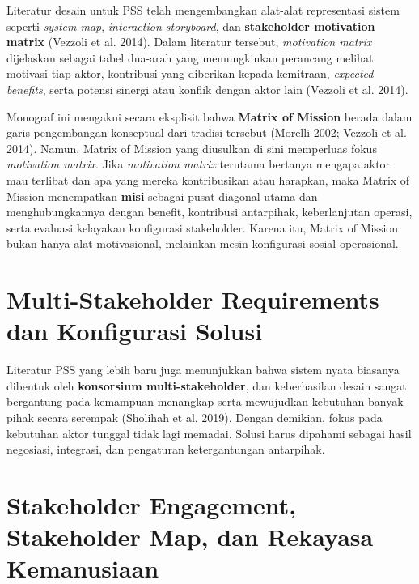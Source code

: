 \documentclass[
  letterpaper,
  DIV=11,
  numbers=noendperiod]{scrreprt}
\begin{document}

Literatur desain untuk PSS telah mengembangkan alat-alat representasi
sistem seperti \emph{system map}, \emph{interaction storyboard}, dan
\textbf{stakeholder motivation matrix} (Vezzoli et al. 2014). Dalam
literatur tersebut, \emph{motivation matrix} dijelaskan sebagai tabel
dua-arah yang memungkinkan perancang melihat motivasi tiap aktor,
kontribusi yang diberikan kepada kemitraan, \emph{expected benefits},
serta potensi sinergi atau konflik dengan aktor lain (Vezzoli et al.
2014).

Monograf ini mengakui secara eksplisit bahwa \textbf{Matrix of Mission}
berada dalam garis pengembangan konseptual dari tradisi tersebut
(Morelli 2002; Vezzoli et al. 2014). Namun, Matrix of Mission yang
diusulkan di sini memperluas fokus \emph{motivation matrix}. Jika
\emph{motivation matrix} terutama bertanya mengapa aktor mau terlibat
dan apa yang mereka kontribusikan atau harapkan, maka Matrix of Mission
menempatkan \textbf{misi} sebagai pusat diagonal utama dan
menghubungkannya dengan benefit, kontribusi antarpihak, keberlanjutan
operasi, serta evaluasi kelayakan konfigurasi stakeholder. Karena itu,
Matrix of Mission bukan hanya alat motivasional, melainkan mesin
konfigurasi sosial-operasional.

\section*{Multi-Stakeholder Requirements dan Konfigurasi
Solusi}\label{multi-stakeholder-requirements-dan-konfigurasi-solusi}


Literatur PSS yang lebih baru juga menunjukkan bahwa sistem nyata
biasanya dibentuk oleh \textbf{konsorsium multi-stakeholder}, dan
keberhasilan desain sangat bergantung pada kemampuan menangkap serta
mewujudkan kebutuhan banyak pihak secara serempak (Sholihah et al.
2019). Dengan demikian, fokus pada kebutuhan aktor tunggal tidak lagi
memadai. Solusi harus dipahami sebagai hasil negosiasi, integrasi, dan
pengaturan ketergantungan antarpihak.

\section*{Stakeholder Engagement, Stakeholder Map, dan Rekayasa
Kemanusiaan}\label{stakeholder-engagement-stakeholder-map-dan-rekayasa-kemanusiaan}
\end{document}
